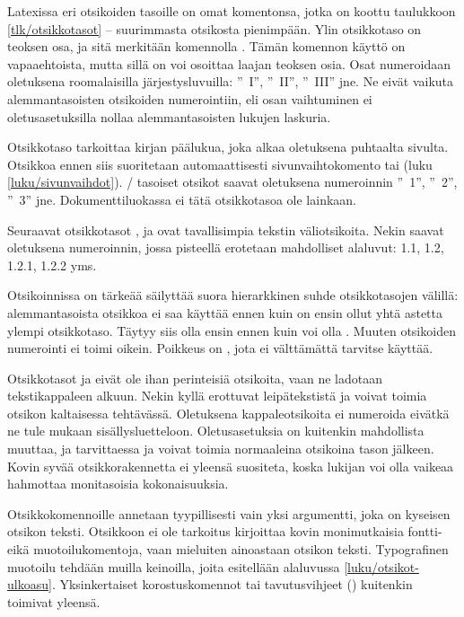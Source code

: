 Latexissa eri otsikoiden tasoille on omat komentonsa, jotka on koottu
taulukkoon \ref{tlk/otsikkotasot} -- suurimmasta otsikosta pienimpään.
Ylin otsikkotaso on teoksen osa, ja sitä merkitään komennolla
. Tämän komennon käyttö on vapaaehtoista, mutta sillä on
voi osoittaa laajan teoksen osia. Osat numeroidaan oletuksena
roomalaisilla järjestysluvuilla: ''\partname~I'', ''\partname~II'',
''\partname~III'' jne. Ne eivät vaikuta alemmantasoisten otsikoiden
numerointiin, eli osan vaihtuminen ei oletusasetuksilla nollaa
alemmantasoisten lukujen laskuria.

Otsikkotaso  tarkoittaa kirjan päälukua, joka alkaa
oletuksena puhtaalta sivulta. Otsikkoa ennen siis suoritetaan
automaattisesti sivunvaihtokomento  tai
 (luku \ref{luku/sivunvaihdot}).
\-/ tasoiset otsikot saavat oletuksena numeroinnin
''\chaptername~1'', ''\chaptername~2'', ''\chaptername~3'' jne.
Dokumenttiluokassa  ei tätä otsikkotasoa ole lainkaan.

Seuraavat otsikkotasot ,  ja
 ovat tavallisimpia tekstin väliotsikoita. Nekin
saavat oletuksena numeroinnin, jossa pisteellä erotetaan mahdolliset
alaluvut: 1.1, 1.2, 1.2.1, 1.2.2 yms.

Otsikoinnissa on tärkeää säilyttää suora hierarkkinen suhde
otsikkotasojen välillä: alemmantasoista otsikkoa ei saa käyttää ennen
kuin on ensin ollut yhtä astetta ylempi otsikkotaso. Täytyy siis olla
ensin  ennen kuin voi olla . Muuten
otsikoiden numerointi ei toimi oikein. Poikkeus on , jota
ei välttämättä tarvitse käyttää.

Otsikkotasot  ja  eivät ole
ihan perinteisiä otsikoita, vaan ne ladotaan tekstikappaleen alkuun.
Nekin kyllä erottuvat leipätekstistä ja voivat toimia otsikon
kaltaisessa tehtävässä. Oletuksena kappaleotsikoita ei numeroida eivätkä
ne tule mukaan sisällysluetteloon. Oletusasetuksia on kuitenkin
mahdollista muuttaa, ja tarvittaessa  ja
 voivat toimia normaaleina otsikoina tason
 jälkeen. Kovin syvää otsikkorakennetta ei
yleensä suositeta, koska lukijan voi olla vaikeaa hahmottaa monitasoisia
kokonaisuuksia.

Otsikkokomennoille annetaan tyypillisesti vain yksi argumentti, joka on
kyseisen otsikon teksti. Otsikkoon ei ole tarkoitus kirjoittaa kovin
monimutkaisia fontti- eikä muotoilukomentoja, vaan mieluiten ainoastaan
otsikon teksti. Typografinen muotoilu tehdään muilla keinoilla, joita
esitellään alaluvussa \ref{luku/otsikot-ulkoasu}. Yksinkertaiset
korostuskomennot tai tavutusvihjeet (\komento{-}) kuitenkin toimivat
yleensä.

